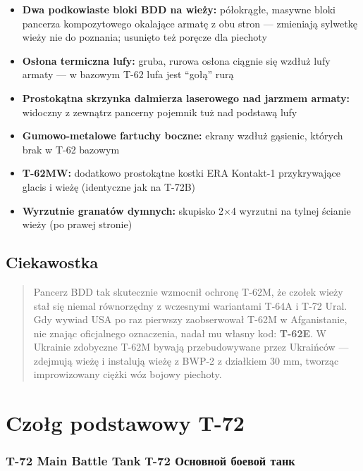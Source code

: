 \documentclass[12pt,oneside]{book}
\providecommand{\tightlist}{%
  \setlength{\itemsep}{0pt}\setlength{\parskip}{0pt}}
\begin{document}
\begin{itemize}
\tightlist
\item
  \textbf{Dwa podkowiaste bloki BDD na wieży:} półokrągłe, masywne bloki
  pancerza kompozytowego okalające armatę z obu stron --- zmieniają
  sylwetkę wieży nie do poznania; usunięto też poręcze dla piechoty
\item
  \textbf{Osłona termiczna lufy:} gruba, rurowa osłona ciągnie się
  wzdłuż lufy armaty --- w bazowym T-62 lufa jest ``gołą'' rurą
\item
  \textbf{Prostokątna skrzynka dalmierza laserowego nad jarzmem armaty:}
  widoczny z zewnątrz pancerny pojemnik tuż nad podstawą lufy
\item
  \textbf{Gumowo-metalowe fartuchy boczne:} ekrany wzdłuż gąsienic,
  których brak w T-62 bazowym
\item
  \textbf{T-62MW:} dodatkowo prostokątne kostki ERA Kontakt-1
  przykrywające glacis i wieżę (identyczne jak na T-72B)
\item
  \textbf{Wyrzutnie granatów dymnych:} skupisko 2×4 wyrzutni na tylnej
  ścianie wieży (po prawej stronie)
\end{itemize}

\subsection{Ciekawostka}\label{ciekawostka-2}

\begin{quote}
Pancerz BDD tak skutecznie wzmocnił ochronę T-62M, że czołek wieży stał
się niemal równorzędny z wczesnymi wariantami T-64A i T-72 Ural. Gdy
wywiad USA po raz pierwszy zaobserwował T-62M w Afganistanie, nie znając
oficjalnego oznaczenia, nadał mu własny kod: \textbf{T-62E}. W Ukrainie
zdobyczne T-62M bywają przebudowywane przez Ukraińców --- zdejmują wieżę
i instalują wieżę z BWP-2 z działkiem 30 mm, tworząc improwizowany
ciężki wóz bojowy piechoty.
\end{quote}

\section{Czołg podstawowy T-72}\label{czoux142g-podstawowy-t-72}

\subsubsection{T-72 Main Battle Tank \textbar{} Т-72 Основной боевой
танк}\label{t-72-main-battle-tank-ux442-72-ux43eux441ux43dux43eux432ux43dux43eux439-ux431ux43eux435ux432ux43eux439-ux442ux430ux43dux43a}
\end{document}
